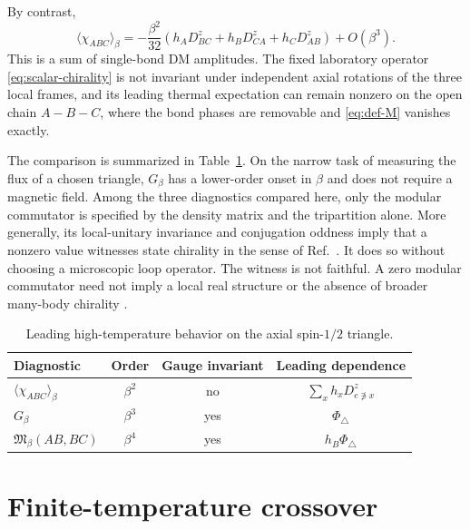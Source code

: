 \documentclass[aps,prb,preprint,nofootinbib,longbibliography]{revtex4-2}
\newcommand{\Mmod}{\mathfrak{M}}
\newcommand{\PhiTri}{\Phi_\triangle}
\begin{document}
By contrast,
\begin{equation}
 \langle\chi_{ABC}\rangle_\beta
 =-\frac{\beta^2}{32}\left(
 h_AD_{BC}^z+h_BD_{CA}^z+h_CD_{AB}^z\right)+O(\beta^3).
 \label{eq:chi-leading}
\end{equation}
This is a sum of single-bond DM amplitudes.  The fixed laboratory operator
\eqref{eq:scalar-chirality} is not invariant under independent axial rotations
of the three local frames, and its leading thermal expectation can remain
nonzero on the open chain $A-B-C$, where the bond phases are removable
and \eqref{eq:def-M} vanishes exactly.

The comparison is summarized in Table~\ref{tab:diagnostics}.  On the narrow
task of measuring the flux of a chosen triangle, $G_\beta$ has a lower-order
onset in $\beta$ and does not require a magnetic field.  Among the three diagnostics
compared here, only the modular commutator is specified by the density matrix
and the tripartition alone.  More generally, its local-unitary invariance and
conjugation oddness imply that a nonzero value witnesses state chirality in
the sense of Ref.~\cite{VardhanEtAl2026}.  It does so without choosing a
microscopic loop operator.  The witness is not faithful.  A zero modular
commutator need not imply a local real structure or the absence of broader
many-body chirality \cite{EllisonEtAl2026}.

\begin{table}[b]
\caption{Leading high-temperature behavior on the axial spin-$1/2$ triangle.}
\label{tab:diagnostics}
\begin{ruledtabular}
\begin{tabular}{lccc}
Diagnostic & Order & Gauge invariant & Leading dependence\\
\hline
$\langle\chi_{ABC}\rangle_\beta$ & $\beta^2$ & no
& $\sum_x h_xD^z_{e\not\ni x}$\\
$G_\beta$ & $\beta^3$ & yes & $\PhiTri$\\
$\Mmod_\beta(AB,BC)$ & $\beta^4$ & yes & $h_B\PhiTri$\\
\end{tabular}
\end{ruledtabular}
\end{table}

\section{Finite-temperature crossover}
\label{sec:finite-temperature}
\end{document}
